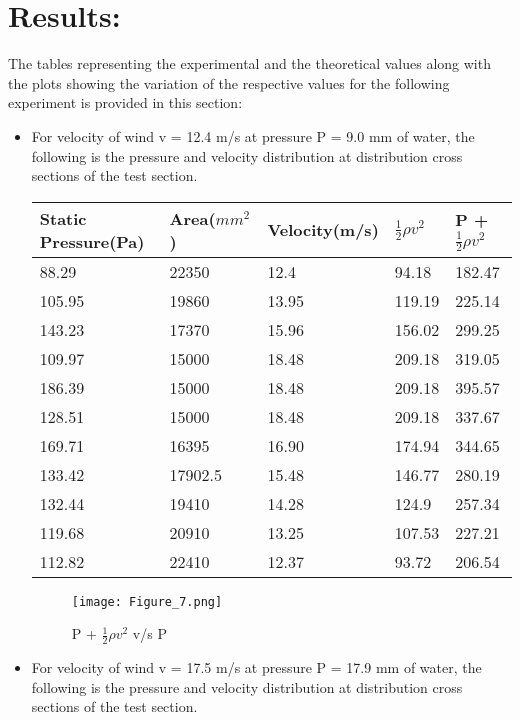 \documentclass[12pt,a4paper]{article}
\begin{document}
\section{Results:}
The tables representing the experimental and the theoretical values along with the plots showing the variation of the respective values for the following experiment is provided in this section:
\begin{itemize}
\item For velocity of wind v = 12.4 m/s at pressure P = 9.0 mm of water, the following is the pressure and velocity distribution at distribution cross sections of the test section.
\clearpage
\begin{table}
\begin{center}
\begin{tabular}{|p{5cm}|p{3cm}|p{2.5cm}|p{2.5cm}|p{2.5cm}|}
\hline
Static Pressure(Pa) & Area($mm^2$) & Velocity(m/s) & $\frac{1}{2} \rho v^2$ & P + $\frac{1}{2} \rho v^2$ \\ 
\hline
88.29&22350&12.4&94.18&182.47\\
105.95&19860&13.95&119.19&225.14\\
143.23&17370&15.96&156.02&299.25\\
109.97&15000&18.48&209.18&319.05\\
186.39&15000&18.48&209.18&395.57\\
128.51&15000&18.48&209.18&337.67\\
169.71&16395&16.90&174.94&344.65\\
133.42&17902.5&15.48&146.77&280.19\\
132.44&19410&14.28&124.9&257.34\\
119.68&20910&13.25&107.53&227.21\\
112.82&22410&12.37&93.72&206.54\\
\hline
\end{tabular}
\end{center}
\end{table}
\begin{figure}[!ht]
	\begin{center}
			\texttt{[image: Figure\_7.png]}
	\end{center}
	\caption{P + $\text{$\frac{1}{2} \rho v^2$}$ v/s P}
\end{figure}
\item For velocity of wind v = 17.5 m/s at pressure P = 17.9 mm of water, the following is the pressure and velocity distribution at distribution cross sections of the test section.
\clearpage
\begin{table}

\end{table}
\end{itemize}
\end{document}
